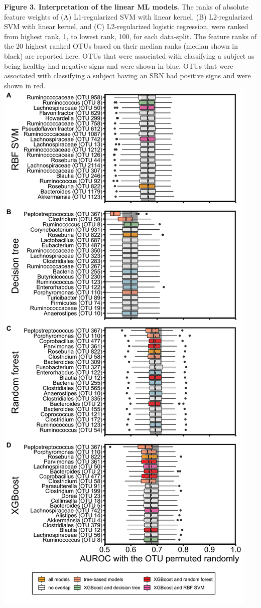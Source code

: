 \documentclass[11pt,]{article}
\begin{document}
\textbf{Figure 3. Interpretation of the linear ML models.} The ranks of
absolute feature weights of (A) L1-regularized SVM with linear kernel,
(B) L2-regularized SVM with linear kernel, and (C) L2-regularized
logistic regression, were ranked from highest rank, 1, to lowest rank,
100, for each data-split. The feature ranks of the 20 highest ranked
OTUs based on their median ranks (median shown in black) are reported
here. OTUs that were associated with classifying a subject as being
healthy had negative signs and were shown in blue. OTUs that were
associated with classifying a subject having an SRN had positive signs
and were shown in red. \newpage
\includegraphics{Figure_4.png}
\end{document}
